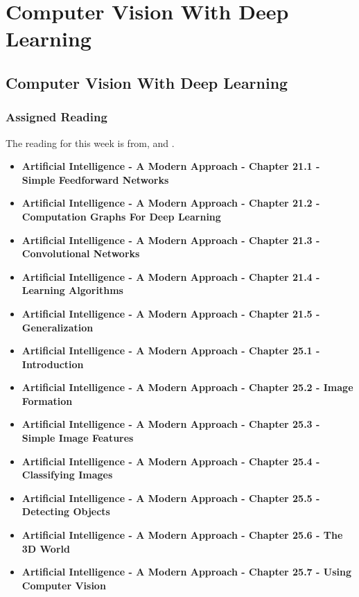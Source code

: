 \clearpage

\renewcommand{\ChapTitle}{Computer Vision With Deep Learning}
\renewcommand{\SectionTitle}{Computer Vision With Deep Learning}

\chapter{\ChapTitle}

\section{\SectionTitle}

\subsection{Assigned Reading}

The reading for this week is from, \AITextbook \hspace*{1pt} and \RLTextbook.

\begin{itemize}
    \item \textbf{Artificial Intelligence - A Modern Approach - Chapter 21.1 - Simple Feedforward Networks}
    \item \textbf{Artificial Intelligence - A Modern Approach - Chapter 21.2 - Computation Graphs For Deep Learning}
    \item \textbf{Artificial Intelligence - A Modern Approach - Chapter 21.3 - Convolutional Networks}
    \item \textbf{Artificial Intelligence - A Modern Approach - Chapter 21.4 - Learning Algorithms}
    \item \textbf{Artificial Intelligence - A Modern Approach - Chapter 21.5 - Generalization}
    \item \textbf{Artificial Intelligence - A Modern Approach - Chapter 25.1 - Introduction}
    \item \textbf{Artificial Intelligence - A Modern Approach - Chapter 25.2 - Image Formation}
    \item \textbf{Artificial Intelligence - A Modern Approach - Chapter 25.3 - Simple Image Features}
    \item \textbf{Artificial Intelligence - A Modern Approach - Chapter 25.4 - Classifying Images}
    \item \textbf{Artificial Intelligence - A Modern Approach - Chapter 25.5 - Detecting Objects}
    \item \textbf{Artificial Intelligence - A Modern Approach - Chapter 25.6 - The 3D World}
    \item \textbf{Artificial Intelligence - A Modern Approach - Chapter 25.7 - Using Computer Vision}
\end{itemize}

